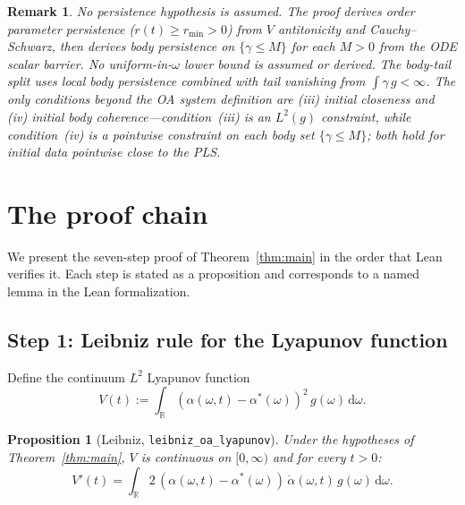 \documentclass[11pt,a4paper]{article}
\newtheorem{proposition}[theorem]{Proposition}
\newtheorem{remark}[theorem]{Remark}
\theoremstyle{definition}
\newcommand{\R}{\mathbb{R}}
\begin{document}
\begin{remark}
No persistence hypothesis is assumed. The proof \emph{derives} order parameter persistence ($r(t) \geq r_{\min} > 0$) from $V$ antitonicity and Cauchy--Schwarz, then derives body persistence on $\{\gamma \leq M\}$ for each $M > 0$ from the ODE scalar barrier. No uniform-in-$\omega$ lower bound is assumed or derived. The body-tail split uses local body persistence combined with tail vanishing from $\int \gamma\,g < \infty$. The only conditions beyond the OA system definition are (iii) initial closeness and (iv) initial body coherence---condition~(iii) is an $L^2(g)$ constraint, while condition~(iv) is a pointwise constraint on each body set $\{\gamma \leq M\}$; both hold for initial data pointwise close to the PLS.
\end{remark}

\section{The proof chain}\label{sec:proof}

We present the seven-step proof of Theorem~\ref{thm:main} in the order that Lean verifies it. Each step is stated as a proposition and corresponds to a named lemma in the Lean formalization.

\subsection{Step 1: Leibniz rule for the Lyapunov function}\label{sec:leibniz}

Define the continuum $L^2$ Lyapunov function
\begin{equation}\label{eq:V}
V(t) := \int_\R (\alpha(\omega,t) - \alpha^*(\omega))^2\,g(\omega)\,\mathrm{d}\omega.
\end{equation}

\begin{proposition}[Leibniz, \texttt{leibniz\_oa\_lyapunov}]\label{prop:leibniz}
Under the hypotheses of Theorem~\ref{thm:main}, $V$ is continuous on $[0,\infty)$ and for every $t > 0$:
\[
V'(t) = \int_\R 2\,(\alpha(\omega,t) - \alpha^*(\omega))\,\dot{\alpha}(\omega,t)\,g(\omega)\,\mathrm{d}\omega.
\]
\end{proposition}
\end{document}
